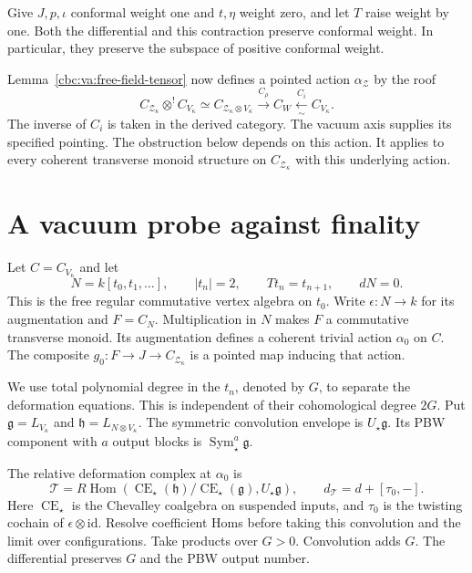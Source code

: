 Give $J,p,\iota$ conformal weight one and $t,\eta$
weight zero, and let $T$ raise weight by one.
Both the differential and this contraction preserve
conformal weight. In particular, they preserve the
subspace of positive conformal weight.

Lemma~\ref{cbc:va:free-field-tensor} now defines a pointed
action $\alpha_{\mathcal Z}$ by the roof
\begin{equation}\label{cbc:va:cochain-roof}
 C_{\mathcal Z_\kappa}\otimes^!C_{V_\kappa}
 \simeq C_{\mathcal Z_\kappa\otimes V_\kappa}
 \xrightarrow{C_\rho}C_W
 \xleftarrow[\sim]{C_i}C_{V_\kappa}.
\end{equation}
The inverse of $C_i$ is taken in the derived category.
The vacuum axis supplies its specified pointing.
The obstruction below depends on this action. It
applies to every coherent transverse monoid structure
on $C_{\mathcal Z_\kappa}$ with this underlying action.

\section{A vacuum probe against finality}
\label{cbc:va:nonfinality}

Let $C=C_{V_\kappa}$ and let
\[
 N=k[t_0,t_1,\ldots],\qquad |t_n|=2,\qquad
 Tt_n=t_{n+1},\qquad dN=0.
\]
This is the free regular commutative vertex algebra
on $t_0$. Write $\epsilon:N\to k$ for its augmentation
and $F=C_N$. Multiplication in $N$ makes $F$ a
commutative transverse monoid. Its augmentation
defines a coherent trivial action $\alpha_0$ on $C$.
The composite $g_0:F\to J\to C_{\mathcal Z_\kappa}$
is a pointed map inducing that action.

We use total polynomial degree in the $t_n$, denoted
by $G$, to separate the deformation equations.
This is independent of their cohomological degree $2G$.
Put $\mathfrak g=L_{V_\kappa}$
and $\mathfrak h=L_{N\otimes V_\kappa}$.
The symmetric convolution envelope is $U_\star\mathfrak g$.
Its PBW component with $a$ output blocks is
$\operatorname{Sym}^a_\star\mathfrak g$.

The relative deformation complex at $\alpha_0$ is
\begin{equation}\label{cbc:va:relative-convolution}
 \mathcal T=
 R\operatorname{Hom}
 \left(
 \operatorname{CE}_\star(\mathfrak h)/
             \operatorname{CE}_\star(\mathfrak g),
 U_\star\mathfrak g
 \right),
 \qquad d_{\mathcal T}=d+[\tau_0,-].
\end{equation}
Here $\operatorname{CE}_\star$ is the Chevalley
coalgebra on suspended inputs, and $\tau_0$ is the
twisting cochain of $\epsilon\otimes\mathrm{id}$.
Resolve coefficient Homs before taking this convolution
and the limit over configurations. Take products over
$G>0$. Convolution adds $G$.
The differential preserves $G$ and the PBW output number.

